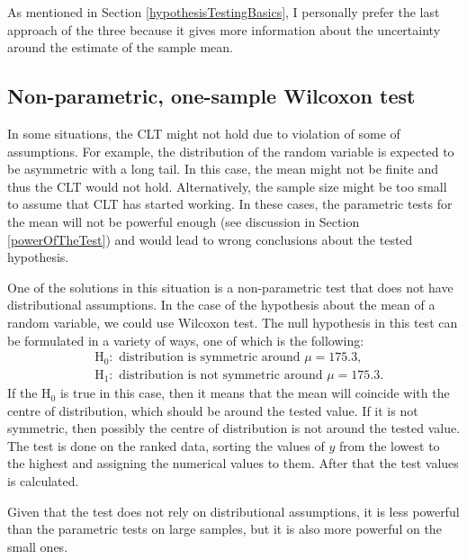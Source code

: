 \documentclass[
]{book}
\theoremstyle{definition}
\theoremstyle{definition}
\theoremstyle{definition}
\theoremstyle{definition}
\theoremstyle{remark}
\begin{document}
As mentioned in Section \ref{hypothesisTestingBasics}, I personally prefer the last approach of the three because it gives more information about the uncertainty around the estimate of the sample mean.

\hypertarget{non-parametric-one-sample-wilcoxon-test}{%
\subsection{Non-parametric, one-sample Wilcoxon test}\label{non-parametric-one-sample-wilcoxon-test}}

In some situations, the CLT might not hold due to violation of some of assumptions. For example, the distribution of the random variable is expected to be asymmetric with a long tail. In this case, the mean might not be finite and thus the CLT would not hold. Alternatively, the sample size might be too small to assume that CLT has started working. In these cases, the parametric tests for the mean will not be powerful enough (see discussion in Section \ref{powerOfTheTest}) and would lead to wrong conclusions about the tested hypothesis.

One of the solutions in this situation is a non-parametric test that does not have distributional assumptions. In the case of the hypothesis about the mean of a random variable, we could use Wilcoxon test. The null hypothesis in this test can be formulated in a variety of ways, one of which is the following:
\begin{equation*}
    \begin{aligned}
        &\mathrm{H}_0: \text{ distribution is symmetric around } \mu = 175.3, \\
        &\mathrm{H}_1: \text{ distribution is not symmetric around } \mu = 175.3 .
    \end{aligned}
\end{equation*}
If the H\(_0\) is true in this case, then it means that the mean will coincide with the centre of distribution, which should be around the tested value. If it is not symmetric, then possibly the centre of distribution is not around the tested value. The test is done on the ranked data, sorting the values of \(y\) from the lowest to the highest and assigning the numerical values to them. After that the test values is calculated.

Given that the test does not rely on distributional assumptions, it is less powerful than the parametric tests on large samples, but it is also more powerful on the small ones.
\end{document}
